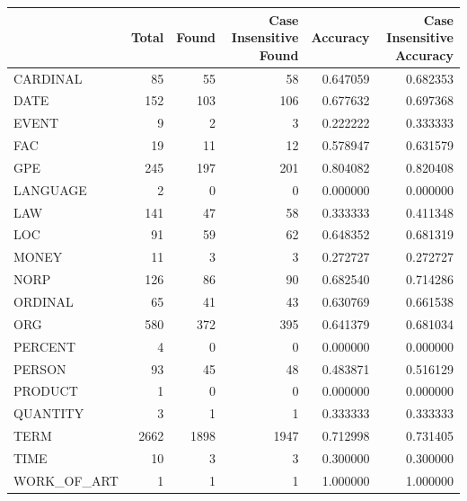 \begin{tabular}{lrrrrr}
\toprule
 & Total & Found & Case Insensitive Found & Accuracy & Case Insensitive Accuracy \\
\midrule
CARDINAL & 85 & 55 & 58 & 0.647059 & 0.682353 \\
DATE & 152 & 103 & 106 & 0.677632 & 0.697368 \\
EVENT & 9 & 2 & 3 & 0.222222 & 0.333333 \\
FAC & 19 & 11 & 12 & 0.578947 & 0.631579 \\
GPE & 245 & 197 & 201 & 0.804082 & 0.820408 \\
LANGUAGE & 2 & 0 & 0 & 0.000000 & 0.000000 \\
LAW & 141 & 47 & 58 & 0.333333 & 0.411348 \\
LOC & 91 & 59 & 62 & 0.648352 & 0.681319 \\
MONEY & 11 & 3 & 3 & 0.272727 & 0.272727 \\
NORP & 126 & 86 & 90 & 0.682540 & 0.714286 \\
ORDINAL & 65 & 41 & 43 & 0.630769 & 0.661538 \\
ORG & 580 & 372 & 395 & 0.641379 & 0.681034 \\
PERCENT & 4 & 0 & 0 & 0.000000 & 0.000000 \\
PERSON & 93 & 45 & 48 & 0.483871 & 0.516129 \\
PRODUCT & 1 & 0 & 0 & 0.000000 & 0.000000 \\
QUANTITY & 3 & 1 & 1 & 0.333333 & 0.333333 \\
TERM & 2662 & 1898 & 1947 & 0.712998 & 0.731405 \\
TIME & 10 & 3 & 3 & 0.300000 & 0.300000 \\
WORK_OF_ART & 1 & 1 & 1 & 1.000000 & 1.000000 \\
\bottomrule
\end{tabular}
